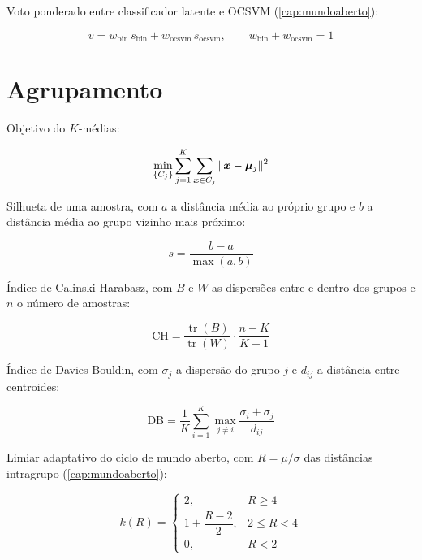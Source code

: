 Voto ponderado entre classificador latente e OCSVM (\cref{cap:mundoaberto}):

\begin{equation}
v = w_{\text{bin}}\, s_{\text{bin}} + w_{\text{ocsvm}}\, s_{\text{ocsvm}},
\qquad w_{\text{bin}} + w_{\text{ocsvm}} = 1
\label{eq:for-voto}
\end{equation}

\section{Agrupamento}

Objetivo do $K$-médias:

\begin{equation}
\min_{\{C_j\}} \sum_{j=1}^{K} \sum_{\bm{x} \in C_j}
\|\bm{x} - \bm{\mu}_j\|^2
\label{eq:for-kmeans}
\end{equation}

Silhueta de uma amostra, com $a$ a distância média ao próprio grupo e $b$ a distância
média ao grupo vizinho mais próximo:

\begin{equation}
s = \frac{b - a}{\max(a, b)}
\label{eq:for-silhueta}
\end{equation}

Índice de Calinski-Harabasz, com $B$ e $W$ as dispersões entre e dentro dos grupos e $n$
o número de amostras:

\begin{equation}
\text{CH} = \frac{\operatorname{tr}(B)}{\operatorname{tr}(W)} \cdot
\frac{n - K}{K - 1}
\label{eq:for-ch}
\end{equation}

Índice de Davies-Bouldin, com $\sigma_j$ a dispersão do grupo $j$ e $d_{ij}$ a distância
entre centroides:

\begin{equation}
\text{DB} = \frac{1}{K} \sum_{i=1}^{K}
\max_{j \ne i} \frac{\sigma_i + \sigma_j}{d_{ij}}
\label{eq:for-db}
\end{equation}

Limiar adaptativo do ciclo de mundo aberto, com $R = \mu/\sigma$ das distâncias
intragrupo (\cref{cap:mundoaberto}):

\begin{equation}
k(R) =
\begin{cases}
2, & R \ge 4 \\[0.2em]
1 + \dfrac{R - 2}{2}, & 2 \le R < 4 \\[0.6em]
0, & R < 2
\end{cases}
\label{eq:for-kadapt}
\end{equation}


